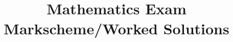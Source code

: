 \documentclass[a4paper,12pt]{article}
\begin{document}
 
\title{\textbf{Mathematics Exam Markscheme/Worked Solutions}} %
\date{} %
\maketitle %

\end{document}
